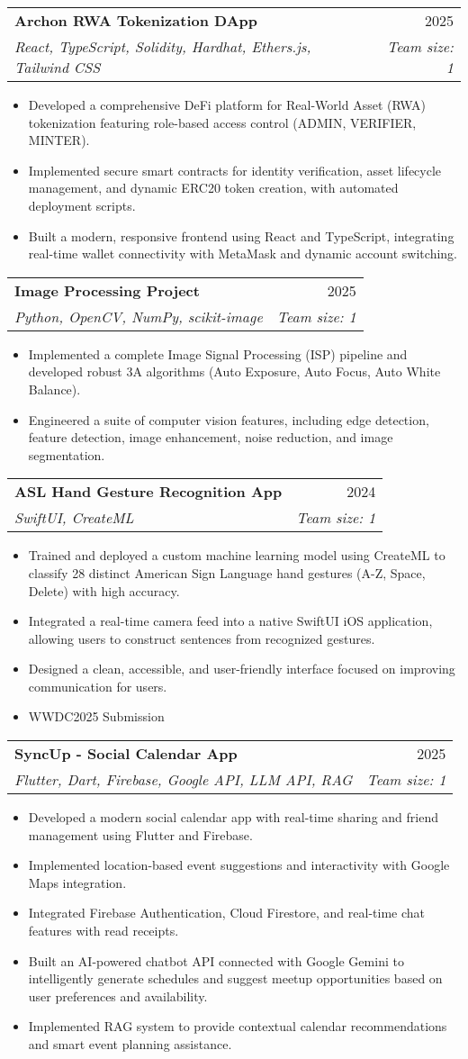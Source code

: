 \documentclass[letterpaper,11pt]{article}
\makeatletter
\newcommand{\resumeItem}[1]{
  \item\small{
    {#1 \vspace{-2pt}}
  }
}
\newcommand{\resumeSubheading}[4]{
  \vspace{-2pt}\item
    \begin{tabular*}{0.97\textwidth}[t]{l@{\extracolsep{\fill}}r}
      \textbf{#1} & #2 \\
      \textit{\small#3} & \textit{\small #4} \\
    \end{tabular*}\vspace{-7pt}
}
\newcommand{\resumeItemListStart}{\begin{itemize}}
\newcommand{\resumeItemListEnd}{\end{itemize}\vspace{-5pt}}
\makeatother
\begin{document}
      \resumeSubheading
      {Archon RWA Tokenization DApp}{2025}
      {React, TypeScript, Solidity, Hardhat, Ethers.js, Tailwind CSS}{Team size: 1}
      \resumeItemListStart
        \resumeItem{Developed a comprehensive DeFi platform for Real-World Asset (RWA) tokenization featuring role-based access control (ADMIN, VERIFIER, MINTER).}
        \resumeItem{Implemented secure smart contracts for identity verification, asset lifecycle management, and dynamic ERC20 token creation, with automated deployment scripts.}
        \resumeItem{Built a modern, responsive frontend using React and TypeScript, integrating real-time wallet connectivity with MetaMask and dynamic account switching.}
      \resumeItemListEnd

      \resumeSubheading
      {Image Processing Project}{2025}
      {Python, OpenCV, NumPy, scikit-image}{Team size: 1}
      \resumeItemListStart
        \resumeItem{Implemented a complete Image Signal Processing (ISP) pipeline and developed robust 3A algorithms (Auto Exposure, Auto Focus, Auto White Balance).}
        \resumeItem{Engineered a suite of computer vision features, including edge detection, feature detection, image enhancement, noise reduction, and image segmentation.}
      \resumeItemListEnd

      \resumeSubheading
      {ASL Hand Gesture Recognition App}{2024}
      {SwiftUI, CreateML}{Team size: 1}
      \resumeItemListStart
        \resumeItem{Trained and deployed a custom machine learning model using CreateML to classify 28 distinct American Sign Language hand gestures (A-Z, Space, Delete) with high accuracy.}
        \resumeItem{Integrated a real-time camera feed into a native SwiftUI iOS application, allowing users to construct sentences from recognized gestures.}
        \resumeItem{Designed a clean, accessible, and user-friendly interface focused on improving communication for users.}
        \resumeItem{WWDC2025 Submission}
      \resumeItemListEnd
      
      \resumeSubheading
      {SyncUp - Social Calendar App}{2025}
      {Flutter, Dart, Firebase, Google API, LLM API, RAG}{Team size: 1}
      \resumeItemListStart
        \resumeItem{Developed a modern social calendar app with real-time sharing and friend management using Flutter and Firebase.}
        \resumeItem{Implemented location-based event suggestions and interactivity with Google Maps integration.}
        \resumeItem{Integrated Firebase Authentication, Cloud Firestore, and real-time chat features with read receipts.}
        \resumeItem{Built an AI-powered chatbot API connected with Google Gemini to intelligently generate schedules and suggest meetup opportunities based on user preferences and availability.}
        \resumeItem{Implemented RAG system to provide contextual calendar recommendations and smart event planning assistance.}
      \resumeItemListEnd
\end{document}
